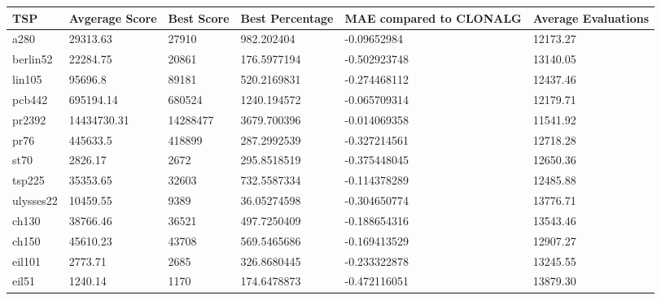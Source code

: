 \begin{table}[H]
	\begin{tabular}{|l|l|l|l|p{2.5cm}|p{2cm}|}
		\hline
		TSP       & Avgerage Score & Best Score & Best Percentage    &\textbf{ MAE compared to CLONALG} & Average Evaluations  \\ \hline
		a280      & 29313.63    & 27910     & 982.202404  & -0.09652984                                                     & 12173.27 \\ \hline
		berlin52  & 22284.75    & 20861     & 176.5977194 & -0.502923748                                                    & 13140.05 \\ \hline
		lin105    & 95696.8     & 89181     & 520.2169831 & -0.274468112                                                    & 12437.46 \\ \hline
		pcb442    & 695194.14   & 680524    & 1240.194572 & -0.065709314                                                    & 12179.71 \\ \hline
		pr2392    & 14434730.31 & 14288477  & 3679.700396 & -0.014069358                                                    & 11541.92 \\ \hline
		pr76      & 445633.5    & 418899    & 287.2992539 & -0.327214561                                                    & 12718.28 \\ \hline
		st70      & 2826.17     & 2672      & 295.8518519 & -0.375448045                                                    & 12650.36 \\ \hline
		tsp225    & 35353.65    & 32603     & 732.5587334 & -0.114378289                                                    & 12485.88 \\ \hline
		ulysses22 & 10459.55    & 9389      & 36.05274598 & -0.304650774                                                    & 13776.71 \\ \hline
		ch130     & 38766.46    & 36521     & 497.7250409 & -0.188654316                                                    & 13543.46 \\ \hline
		ch150     & 45610.23    & 43708     & 569.5465686 & -0.169413529                                                    & 12907.27 \\ \hline
		eil101    & 2773.71     & 2685      & 326.8680445 & -0.233322878                                                    & 13245.55 \\ \hline
		eil51     & 1240.14     & 1170      & 174.6478873 & -0.472116051                                                    & 13879.30 \\ \hline

\end{tabular}
\end{table}
